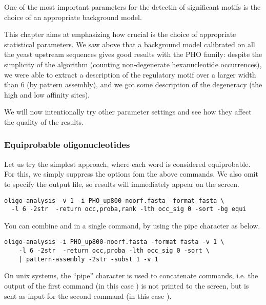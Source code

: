 One of the most important parameters for the detectin of significant
motifs is the choice of an appropriate background model. 


This chapter aims at emphasizing how crucial is the choice of
appropriate statistical parameters. We saw above that a background
model calibrated on all the yeast upstream sequences gives good
results with the PHO family: despite the simplicity of the algorithm
(counting non-degenerate hexanucleotide occurrences), we were able to
extract a description of the regulatory motif over a larger width than
6 (by pattern assembly), and we got some description of the degeneracy
(the high and low affinity sites).

We will now intentionally try other parameter settings and see how
they affect the quality of the results.

\subsubsection{Equiprobable oligonucleotides}

Let us try the simplest approach, where each word is considered
equiprobable. For this, we simply suppress the options  fom the above commands. We
also omit to specify the output file, so results will immediately
appear on the screen.

{\color{Blue} \begin{footnotesize} 
\begin{verbatim}
oligo-analysis -v 1 -i PHO_up800-noorf.fasta -format fasta \
  -l 6 -2str  -return occ,proba,rank -lth occ_sig 0 -sort -bg equi
\end{verbatim} \end{footnotesize}
}

You can combine  and
 in a single command, by using the pipe
character as below.

{\color{Blue} \begin{footnotesize} 
\begin{verbatim}
oligo-analysis -i PHO_up800-noorf.fasta -format fasta -v 1 \
    -l 6 -2str  -return occ,proba -lth occ_sig 0 -sort \
    | pattern-assembly -2str -subst 1 -v 1 
\end{verbatim} \end{footnotesize}
}

On unix systems, the ``pipe'' character is used to concatenate
commands, i.e. the output of the first command (in this case
) is not printed to the screen, but is sent as
input for the second command (in this case ).

